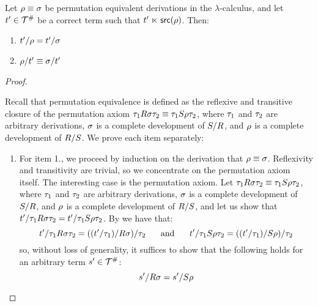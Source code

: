 \begin{proposition}
Let $\rho \equiv \sigma$ be permutation equivalent derivations in the $\lambda$-calculus,
and let $t' \in \mathcal{T}^{\mathtt{\#}}$ be a correct term such that $t' \mathrel{\ltimes} \mathsf{src}(\rho)$.
Then:
\begin{enumerate}
\item $t'/\rho = t'/\sigma$
\item $\rho/t' \equiv \sigma/t'$
\end{enumerate}
\end{proposition}
\begin{proof}
\begin{pabloenv}
Recall that permutation equivalence is defined as the reflexive and transitive closure of the
permutation axiom $\tau_1 R \sigma \tau_2 \equiv \tau_1 S \rho \tau_2$,
where
$\tau_1$ and $\tau_2$ are arbitrary derivations,
$\sigma$ is a complete development of $S/R$,
and $\rho$ is a complete development of $R/S$.
We prove each item separately:
\begin{enumerate}
\item
  For item 1., we proceed by induction on the derivation that $\rho \equiv \sigma$.
  Reflexivity and transitivity are trivial, so we concentrate on the permutation axiom itself.
  The interesting case is the permutation axiom.
  Let $\tau_1 R \sigma \tau_2 \equiv \tau_1 S \rho \tau_2$,
  where
  $\tau_1$ and $\tau_2$ are arbitrary derivations,
  $\sigma$ is a complete development of $S/R$,
  and $\rho$ is a complete development of $R/S$,
  and let us show that $t'/\tau_1 R \sigma \tau_2 = t'/\tau_1 S \rho \tau_2$.
  By  we have that:
  \[
    t'/\tau_1 R \sigma \tau_2 = ((t'/\tau_1)/R \sigma)/\tau_2
    \hspace{.5cm}
    \text{ and }
    \hspace{.5cm}
    t'/\tau_1 S \rho \tau_2 = ((t'/\tau_1)/S \rho)/ \tau_2
  \]
  so, without loss of generality,
  it suffices to show that the following holds for an arbitrary term $s' \in \mathcal{T}^{\mathtt{\#}}$:
  \[
    s'/R\sigma = s'/S\rho
\]
\end{enumerate}
\end{pabloenv}
\end{proof}
